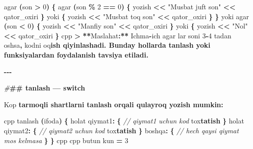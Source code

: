 \documentclass[a4paper,11pt,twoside,openright]{book}
\newenvironment{Shaded}{\begin{snugshade}}{\end{snugshade}}
\newcommand{\CharTok}[1]{\textcolor[rgb]{0.31,0.60,0.02}{#1}}
\newcommand{\CommentTok}[1]{\textcolor[rgb]{0.56,0.35,0.01}{\textit{#1}}}
\newcommand{\DecValTok}[1]{\textcolor[rgb]{0.00,0.00,0.81}{#1}}
\newcommand{\ErrorTok}[1]{\textcolor[rgb]{0.64,0.00,0.00}{\textbf{#1}}}
\newcommand{\NormalTok}[1]{#1}
\newcommand{\OperatorTok}[1]{\textcolor[rgb]{0.81,0.36,0.00}{\textbf{#1}}}
\newcommand{\PreprocessorTok}[1]{\textcolor[rgb]{0.56,0.35,0.01}{\textit{#1}}}
\newcommand{\StringTok}[1]{\textcolor[rgb]{0.31,0.60,0.02}{#1}}
\begin{document}
\begin{Shaded}
\begin{Highlighting}[]
\NormalTok{agar }\OperatorTok{(}\NormalTok{son }\OperatorTok{\textgreater{}} \DecValTok{0}\OperatorTok{)} \OperatorTok{\{}
\NormalTok{    agar }\OperatorTok{(}\NormalTok{son }\OperatorTok{\%} \DecValTok{2} \OperatorTok{==} \DecValTok{0}\OperatorTok{)} \OperatorTok{\{}
\NormalTok{        yozish }\OperatorTok{\textless{}\textless{}} \StringTok{"Musbat juft son"} \OperatorTok{\textless{}\textless{}}\NormalTok{ qator\_oxiri}
    \OperatorTok{\}}\NormalTok{ yoki }\OperatorTok{\{}
\NormalTok{        yozish }\OperatorTok{\textless{}\textless{}} \StringTok{"Musbat toq son"} \OperatorTok{\textless{}\textless{}}\NormalTok{ qator\_oxiri}
    \OperatorTok{\}}
\OperatorTok{\}}\NormalTok{ yoki agar }\OperatorTok{(}\NormalTok{son }\OperatorTok{\textless{}} \DecValTok{0}\OperatorTok{)} \OperatorTok{\{}
\NormalTok{    yozish }\OperatorTok{\textless{}\textless{}} \StringTok{"Manfiy son"} \OperatorTok{\textless{}\textless{}}\NormalTok{ qator\_oxiri}
\OperatorTok{\}}\NormalTok{ yoki }\OperatorTok{\{}
\NormalTok{    yozish }\OperatorTok{\textless{}\textless{}} \StringTok{"Nol"} \OperatorTok{\textless{}\textless{}}\NormalTok{ qator\_oxiri}
\OperatorTok{\}}
\ErrorTok{\textasciigrave{}\textasciigrave{}\textasciigrave{}}\NormalTok{cpp}
\OperatorTok{\textgreater{}} \OperatorTok{**}\NormalTok{Maslahat}\OperatorTok{:**}\NormalTok{ Ichma}\OperatorTok{{-}}\NormalTok{ich }\ErrorTok{\textasciigrave{}}\NormalTok{agar}\ErrorTok{\textasciigrave{}}\NormalTok{ lar soni }\DecValTok{3}\OperatorTok{{-}}\DecValTok{4}\NormalTok{ tadan oshsa}\OperatorTok{,}\NormalTok{ kodni o}\CharTok{\textquotesingle{}q}\ErrorTok{ish qiyinlashadi. Bunday hollarda \textasciigrave{}tanlash\textasciigrave{} yoki funksiyalardan foydalanish tavsiya etiladi.}

\OperatorTok{{-}{-}{-}}

\PreprocessorTok{\#}\ErrorTok{\#\# \textasciigrave{}tanlash\textasciigrave{} — \textasciigrave{}switch\textasciigrave{}}

\NormalTok{Ko}\CharTok{\textquotesingle{}p}\ErrorTok{ tarmoqli shartlarni \textasciigrave{}tanlash\textasciigrave{} orqali qulayroq yozish mumkin:}

\ErrorTok{\textasciigrave{}\textasciigrave{}\textasciigrave{}}\NormalTok{cpp}
\NormalTok{tanlash }\OperatorTok{(}\NormalTok{ifoda}\OperatorTok{)} \OperatorTok{\{}
\NormalTok{    holat qiymat1}\OperatorTok{:} \OperatorTok{\{}
        \CommentTok{// qiymat1 uchun kod}
\NormalTok{        to}\CharTok{\textquotesingle{}x}\ErrorTok{tatish}
    \OperatorTok{\}}
\NormalTok{    holat qiymat2}\OperatorTok{:} \OperatorTok{\{}
        \CommentTok{// qiymat2 uchun kod}
\NormalTok{        to}\CharTok{\textquotesingle{}x}\ErrorTok{tatish}
    \OperatorTok{\}}
\NormalTok{    boshqa}\OperatorTok{:} \OperatorTok{\{}
        \CommentTok{// hech qaysi qiymat mos kelmasa}
    \OperatorTok{\}}
\OperatorTok{\}}
\ErrorTok{\textasciigrave{}\textasciigrave{}\textasciigrave{}}\NormalTok{cpp}
\ErrorTok{\textasciigrave{}\textasciigrave{}\textasciigrave{}}\NormalTok{cpp}
\NormalTok{butun kun }\OperatorTok{=} \DecValTok{3}


\end{Highlighting}
\end{Shaded}
\end{document}
